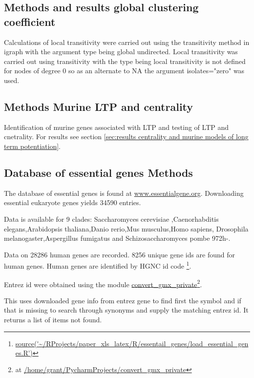 \subsection{Methods and results global clustering coefficient}
Calculations of local transitivity were carried out using the transitivity method in igraph with the argument type being global undirected. Local transitivity was carried out using transitivity with the type being local transitivity is not defined for nodes of degree 0 so as an alternate to NA the argument isolates="zero" was used. 

\subsection{Methods Murine LTP and centrality}
Identification of murine genes associated with LTP and testing of LTP and cnetrality. For results see section \ref{sec:results centrality and murine models of long term potentiation}.


\subsection{Database of essential genes Methods}
 \label{sec:Database of essential genes}
 
 
 The database of essential genes is found at \url{www.essentialgene.org}. Downloading essential eukaryote genes yields 34590 entries.
 
 Data is available for 9 clades:  Saccharomyces cerevisiae   ,Caenorhabditis elegans,Arabidopsis thaliana,Danio rerio,Mus musculus,Homo sapiens,
 Drosophila melanogaster,Aspergillus fumigatus and Schizosaccharomyces pombe 972h-.
 
 Data on 28286  human genes are recorded. 8256 unique gene ids are found for human genes. Human genes are identified by HGNC id code \footnote{\url{source('~/RProjects/paper_xls_latex/R/essentail_genes/load_essential_genes.R')}}.
 
 Entrez id were obtained using the module \url{convert_gmx_private}\footnote{ at \url{/home/grant/PycharmProjects/convert_gmx_private}}.
 
 This uses downloaded gene info from entrez gene to find first the symbol and if that is missing to search through synonyms and supply the matching entrez id. It returns a list of items not found. 
 
